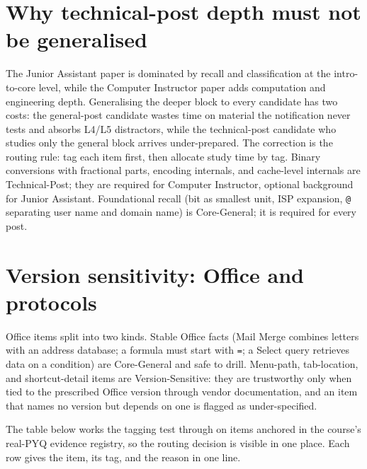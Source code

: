 \documentclass[11pt]{article}
\begin{document}
\section{Why technical-post depth must not be generalised}

The Junior Assistant paper is dominated by recall and classification at the
intro-to-core level, while the Computer Instructor paper adds computation and
engineering depth. Generalising the deeper block to every candidate has two
costs: the general-post candidate wastes time on material the notification
never tests and absorbs L4/L5 distractors, while the technical-post candidate
who studies only the general block arrives under-prepared. The correction is
the routing rule: tag each item first, then allocate study time by tag. Binary
conversions with fractional parts, encoding internals, and cache-level
internals are Technical-Post; they are required for Computer Instructor,
optional background for Junior Assistant. Foundational recall (bit as smallest
unit, ISP expansion, \texttt{@} separating user name and domain name) is
Core-General; it is required for every post.

\section{Version sensitivity: Office and protocols}

Office items split into two kinds. Stable Office facts (Mail Merge combines
letters with an address database; a formula must start with \texttt{=}; a
Select query retrieves data on a condition) are Core-General and safe to
drill. Menu-path, tab-location, and shortcut-detail items are
Version-Sensitive: they are trustworthy only when tied to the prescribed
Office version through vendor documentation, and an item that names no version
but depends on one is flagged as under-specified.

The table below works the tagging test through on items anchored in the
course's real-PYQ evidence registry, so the routing decision is visible in one
place. Each row gives the item, its tag, and the reason in one line.
\end{document}

